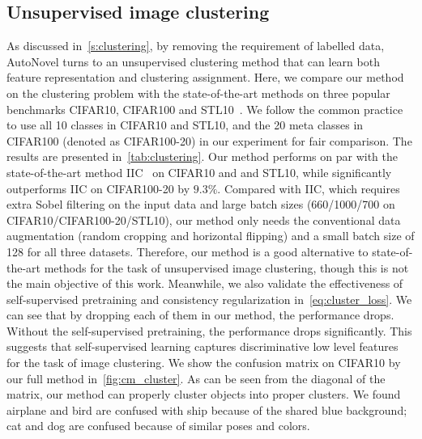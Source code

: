 \subsection{Unsupervised image clustering}
As discussed in~\cref{s:clustering}, by removing the requirement of labelled data, AutoNovel turns to an unsupervised clustering method that can learn both feature representation and clustering assignment.
Here, we compare our method on the clustering problem with the state-of-the-art methods on three popular benchmarks CIFAR10, CIFAR100 and STL10~\cite{Coates11STL10}.
We follow the common practice to use all 10 classes in CIFAR10 and STL10, and the 20 meta classes in CIFAR100 (denoted as CIFAR100-20) in our experiment for fair comparison.
The results are presented in~\cref{tab:clustering}.
Our method performs on par with the state-of-the-art method IIC~\cite{ji2019invariant} on CIFAR10 and and STL10, while significantly outperforms IIC on CIFAR100-20 by $9.3\%$.
Compared with IIC, which requires extra Sobel filtering on the input data and large batch sizes (660/1000/700 on CIFAR10/CIFAR100-20/STL10), our method only needs the conventional data augmentation (random cropping and horizontal flipping) and a small batch size of 128 for all three datasets.
Therefore, our method is a good alternative to state-of-the-art methods for the task of unsupervised image clustering, though this is not the main objective of this work.
Meanwhile, we also validate the effectiveness of self-supervised pretraining and consistency regularization in~\cref{eq:cluster_loss}.
We can see that by dropping each of them in our method, the performance drops.
Without the self-supervised pretraining, the performance drops significantly. This suggests that self-supervised learning captures discriminative low level features for the task of image clustering. 
We show the confusion matrix on CIFAR10 by our full method in~\cref{fig:cm_cluster}.
As can be seen from the diagonal of the matrix, our method can properly cluster objects into proper clusters.
We found airplane and bird are confused with ship because of the shared blue background; cat and dog are confused because of similar poses and colors.

